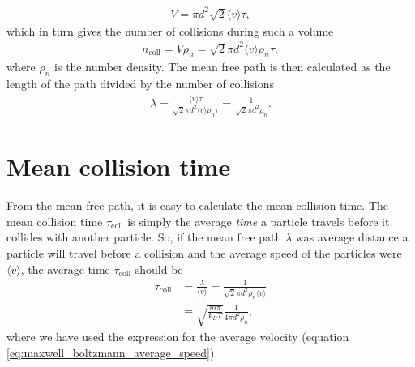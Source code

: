 \begin{align}
	V = \pi d^2\sqrt 2\langle v\rangle \tau,
\end{align}
which in turn gives the number of collisions during such a volume
\begin{align}
	\label{eq:num_collisions}
	n_\text{coll} = V\rho_n = \sqrt 2 \pi d^2\langle v\rangle \rho_n \tau,
\end{align}
where $\rho_n$ is the number density. The mean free path is then calculated as the length of the path divided by the number of collisions
\begin{align}
	\label{eq:mean_free_path}
	\lambda = \frac{\langle v\rangle \tau}{ \sqrt 2 \pi d^2\langle v\rangle \rho_n\tau} = \frac{1 }{ \sqrt 2 \pi d^2 \rho_n}.
\end{align}
\section{Mean collision time}
From the mean free path, it is easy to calculate the mean collision time. The mean collision time $\tau_\text{coll}$ is simply the average \textit{time} a particle travels before it collides with another particle. So, if the mean free path $\lambda$ was average distance a particle will travel before a collision and the average speed of the particles were $\langle v \rangle$, the average time $\tau_\text{coll}$ should be
\begin{align}
	\label{eq:kinetic_theory_mean_collision_time}
	\tau_\text{coll} &= \frac{\lambda}{\langle v\rangle} = \frac{1}{\sqrt 2 \pi d^2 \rho_n \langle v \rangle}\\
	&= \sqrt{\frac{m\pi}{k_B T}}\frac{1}{4\pi d^2\rho_n},
\end{align}
where we have used the expression for the average velocity (equation \eqref{eq:maxwell_boltzmann_average_speed}). 